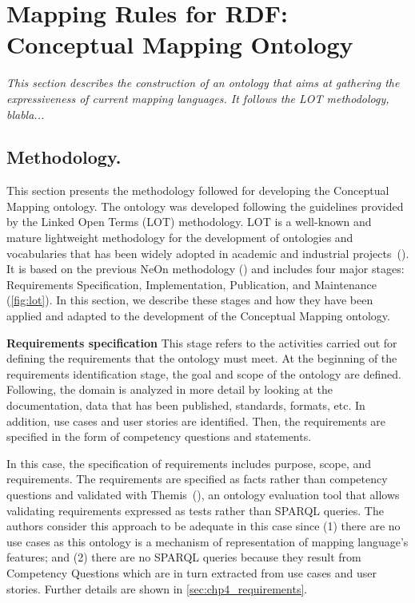 \section{Mapping Rules for RDF: Conceptual Mapping Ontology}
\label{sec:chp4_cm_ontology}

\textit{This section describes the construction of an ontology that aims at gathering the expressiveness of current mapping languages. It follows the LOT methodology, blabla...}

\subsection{Methodology.}
This section presents the methodology followed for developing the Conceptual Mapping ontology. The ontology was developed following the guidelines provided by the Linked Open Terms (LOT) methodology. LOT is a well-known and mature lightweight methodology for the development of ontologies and vocabularies that has been widely adopted in academic and industrial projects~(\cite{poveda2022lot}). It is based on the previous NeOn methodology (\cite{suarez2015neon}) and includes four major stages: Requirements Specification, Implementation, Publication, and Maintenance (\cref{fig:lot}). In this section, we describe these stages and how they have been applied and adapted to the development of the Conceptual Mapping ontology.

\noindent\textbf{Requirements specification}
This stage refers to the activities carried out for defining the requirements that the ontology must meet. At the beginning of the requirements identification stage, the goal and scope of the ontology are defined. Following, the domain is analyzed in more detail by looking at the documentation, data that has been published, standards, formats, etc. In addition, use cases and user stories are identified. Then, the requirements are specified in the form of competency questions and statements. 

In this case, the specification of requirements includes purpose, scope, and requirements. The requirements are specified as facts rather than competency questions and validated with Themis~(\cite{fernandez2021themis}), an ontology evaluation tool that allows validating requirements expressed as tests rather than SPARQL queries. The authors consider this approach to be adequate in this case since (1) there are no use cases as this ontology is a mechanism of representation of  mapping language's features; and (2) there are no SPARQL queries because they result from Competency Questions which are in turn extracted from use cases and user stories. Further details are shown in \cref{sec:chp4_requirements}.


